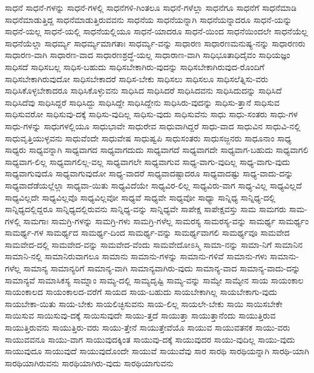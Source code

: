 {ಸಾಧನೆ
ಸಾಧನೆ-ಗಳನ್ನು
ಸಾಧನೆ-ಗಳಲ್ಲಿ
ಸಾಧನೆಗಳಿ-ಗಿಂತಲೂ
ಸಾಧನೆ-ಗಳೆಲ್ಲಾ
ಸಾಧನೆಗೂ
ಸಾಧನೆಗೆ
ಸಾಧನೆಮಾಡಿ
ಸಾಧನೆಮಾಡುತ್ತಿದ್ದ
ಸಾಧನೆಮಾಡುತ್ತಿರುವವನು
ಸಾಧನೆಯ
ಸಾಧನೆಯನ್ನಾಗಿ
ಸಾಧನೆಯನ್ನಾದರೂ
ಸಾಧನೆ-ಯನ್ನು
ಸಾಧನೆ-ಯಲ್ಲ
ಸಾಧನೆ-ಯಲ್ಲಿ
ಸಾಧನೆಯಲ್ಲಿಯೂ
ಸಾಧನೆ-ಯಾದರೂ
ಸಾಧನೆ-ಯಿಂದ
ಸಾಧನೆಯಿಂದಲೇ
ಸಾಧನೆಯೆಲ್ಲ
ಸಾಧನೆಯೆಲ್ಲಾ
ಸಾಧರ್ಮ್ಯ
ಸಾಧರ್ಮ್ಯಮಾಗತಾಃ
ಸಾಧರ್ಮ್ಯ-ವನ್ನು
ಸಾಧಾರಣ
ಸಾಧಾರಣಮನುಷ್ಯ-ನನ್ನು
ಸಾಧಾರಣರು
ಸಾಧಾರಣ-ವಾಗಿ
ಸಾಧಾರಣ-ವಾದ
ಸಾಧಾರಣಶ್ರದ್ಧೆ-ಯಲ್ಲ
ಸಾಧಾರಾಣ-ವಾಗಿ
ಸಾಧಿಭೂತಾಧಿದೈವಂ
ಸಾಧಿಯಜ್ಞಂ
ಸಾಧಿಸದೆ
ಸಾಧಿಸಬಲ್ಲ
ಸಾಧಿಸ-ಬಹುದು
ಸಾಧಿಸಬೇಕಾಗಿರು-ವುದನ್ನು
ಸಾಧಿಸಬೇಕಾಗಿರುವುದ-ರೊಂದಿಗೆ
ಸಾಧಿಸಬೇಕಾಗಿರುವುದೋ
ಸಾಧಿಸಬೇಕಾದರೆ
ಸಾಧಿಸ-ಬೇಕು
ಸಾಧಿಸಲು
ಸಾಧಿಸಲೂ
ಸಾಧಿಸಲೆತ್ನಿಸು-ವರು
ಸಾಧಿಸಿಕೊಳ್ಳಬೇಕಾದರೂ
ಸಾಧಿಸಿಕೊಳ್ಳುವನು
ಸಾಧಿಸಿದ
ಸಾಧಿಸಿದರೆ
ಸಾಧಿಸಿದವನು
ಸಾಧಿಸಿದುದನ್ನು
ಸಾಧಿಸಿದೆ
ಸಾಧಿಸಿದೆವು
ಸಾಧಿಸಿದ್ದರೆ
ಸಾಧಿಸಿದ್ದು
ಸಾಧಿಸಿದ್ದೇ
ಸಾಧಿಸಿದ್ದೇನು
ಸಾಧಿಸಿರು-ವುದನ್ನು
ಸಾಧಿಸು-ತ್ತಾನೆ
ಸಾಧಿಸುವ
ಸಾಧಿಸುವರೋ
ಸಾಧಿಸುವು-ದಕ್ಕೆ
ಸಾಧಿಸು-ವುದಿಲ್ಲ
ಸಾಧಿಸು-ವುದು
ಸಾಧಿಸುವೆನು
ಸಾಧು
ಸಾಧು-ಸಂತರು
ಸಾಧು-ಗಳ
ಸಾಧು-ಗಳನ್ನು
ಸಾಧುಗಳಲ್ಲಿಯೂ
ಸಾಧುಭಾವೇ
ಸಾಧುರೇವ
ಸಾಧುವಾಗಿದ್ದರೆ
ಸಾಧು-ವಾದ
ಸಾಧುವಿನ
ಸಾಧುವಿ-ನಲ್ಲಿ
ಸಾಧುವೃತ್ತಿಯುಳ್ಳವನು
ಸಾಧುವೆಂದೇ
ಸಾಧುವೇಷ
ಸಾಧುಷ್ವಪಿ
ಸಾಧುಸಂತರು
ಸಾಧುಸಜ್ಜನರು
ಸಾಧೂನಾಂ
ಸಾಧ್ಯ
ಸಾಧ್ಯರು
ಸಾಧ್ಯವನ್ನಾಗಿ
ಸಾಧ್ಯವಾಗದ
ಸಾಧ್ಯವಾಗದುದು
ಸಾಧ್ಯವಾಗದೆ
ಸಾಧ್ಯವಾಗದೇ
ಸಾಧ್ಯವಾಗ-ಬಹುದು
ಸಾಧ್ಯವಾಗಲಿ
ಸಾಧ್ಯವಾಗ-ಲಿಲ್ಲ
ಸಾಧ್ಯವಾಗಲಿಲ್ಲ-ವಲ್ಲ
ಸಾಧ್ಯವಾಗಲೇ
ಸಾಧ್ಯವಾಗುವ
ಸಾಧ್ಯ-ವಾಗು-ವುದಿಲ್ಲ
ಸಾಧ್ಯ-ವಾಗು-ವುದು
ಸಾಧ್ಯವಾಗುವುದೊ
ಸಾಧ್ಯವಾಗುವುದೋ
ಸಾಧ್ಯ-ವಾದರೆ
ಸಾಧ್ಯವಾದಷ್ಟಾದರೂ
ಸಾಧ್ಯವಾದಷ್ಟು
ಸಾಧ್ಯ-ವಾದು-ದನ್ನು
ಸಾಧ್ಯವಾದೆಡೆಯಲ್ಲೆಲ್ಲಾ
ಸಾಧ್ಯವಾ-ಯಿತು
ಸಾಧ್ಯವಿದೆಯೇ
ಸಾಧ್ಯವಿರ-ಲಿಲ್ಲ
ಸಾಧ್ಯವಿರು-ವಾಗ
ಸಾಧ್ಯ-ವಿಲ್ಲ
ಸಾಧ್ಯವಿಲ್ಲದೆ
ಸಾಧ್ಯವಿಲ್ಲದೇ
ಸಾಧ್ಯವಿಲ್ಲವೊ
ಸಾಧ್ಯವಿಲ್ಲವೋ
ಸಾಧ್ಯವೆ
ಸಾಧ್ಯವೇ
ಸಾಧ್ಯವೋ
ಸಾಧ್ಯಾ
ಸಾನ್ನಿಧ್ಯ
ಸಾನ್ನಿಧ್ಯ-ದಲ್ಲಿ
ಸಾನ್ನಿಧ್ಯದಲ್ಲಿದ್ದರೂ
ಸಾನ್ನಿಧ್ಯದಲ್ಲಿರುವನು
ಸಾನ್ನಿಧ್ಯ-ವನ್ನು
ಸಾನ್ನಿಧ್ಯವೇ
ಸಾಪೇಕ್ಷ
ಸಾಪೇಕ್ಷವಸ್ತು
ಸಾಮ
ಸಾಮಗರು
ಸಾಮ-ಗಳಲ್ಲಿ
ಸಾಮಗಾಃ
ಸಾಮಗ್ರಿ-ಗಳನ್ನು
ಸಾಮಗ್ರಿ-ಗಳು
ಸಾಮಗ್ರಿ-ಗಳೆಲ್ಲ
ಸಾಮರಸ್ಯ
ಸಾಮರಸ್ಯ-ವನ್ನು
ಸಾಮರ್ಥ್ಯ
ಸಾಮರ್ಥ್ಯಂ
ಸಾಮರ್ಥ್ಯ-ಗಳ
ಸಾಮರ್ಥ್ಯದ
ಸಾಮರ್ಥ್ಯ-ದಿಂದ
ಸಾಮರ್ಥ್ಯ-ವನ್ನು
ಸಾಮರ್ಥ್ಯವಾಗಲಿ
ಸಾಮರ್ಥ್ಯವೂ
ಸಾಮವೇದ
ಸಾಮವೇದ-ದಲ್ಲಿ
ಸಾಮವೇದ-ವನ್ನು
ಸಾಮವೇದ-ವೆಂದು
ಸಾಮವೇದೋಽಸ್ಮಿ
ಸಾಮಾ-ನನ್ನು
ಸಾಮಾ-ನಿಗೆ
ಸಾಮಾನಿನ
ಸಾಮಾನಿ-ನಲ್ಲಿ
ಸಾಮಾನಿರುವಾಗಲೂ
ಸಾಮಾನು
ಸಾಮಾನು-ಗಳನ್ನು
ಸಾಮಾನು-ಗಳಿವೆ
ಸಾಮಾನು-ಗಳು
ಸಾಮಾನು-ಗಳೆಲ್ಲ
ಸಾಮಾನ್ಯ
ಸಾಮಾನ್ಯರಿಗೆ
ಸಾಮಾನ್ಯ-ವಾಗಿ
ಸಾಮಾನ್ಯವಾಗಿರು-ವುದು
ಸಾಮಾನ್ಯ-ವಾದ
ಸಾಮಾನ್ಯ-ವಾದು-ದನ್ನು
ಸಾಮಾನ್ಯವೆ
ಸಾಮಾಸಿಕಸ್ಯ
ಸಾಮ್ನಾಂ
ಸಾಮ್ಯ-ದಲ್ಲಿ
ಸಾಮ್ಯದೃಷ್ಟಿ
ಸಾಮ್ಯ-ವನ್ನು
ಸಾಮ್ಯೇ
ಸಾಮ್ಯೇನ
ಸಾಯ
ಸಾಯಂಕಾಲ
ಸಾಯಂಕಾಲದ
ಸಾಯಂಕಾಲದ-ವರೆಗೆ
ಸಾಯದ
ಸಾಯ-ಬಹುದು
ಸಾಯಬೇಕಾಗಿಲ್ಲ
ಸಾಯಬೇಕಾಗು-ವುದು
ಸಾಯಬೇಕಾ-ಯಿತು
ಸಾಯ-ಬೇಕು
ಸಾಯಲಿಚ್ಛಿಸುವನು
ಸಾಯ-ಲಿಲ್ಲ
ಸಾಯಲೇ-ಬೇಕು
ಸಾಯಿ
ಸಾಯಿಸಬೇಕೇ
ಸಾಯಿಸುವ
ಸಾಯಿಸುವು-ದಕ್ಕೆ
ಸಾಯಿಸುವುದೇ
ಸಾಯು-ತ್ತದೆ
ಸಾಯುತ್ತಾ
ಸಾಯುತ್ತಾನೆಂದು
ಸಾಯುತ್ತಿರುವ
ಸಾಯುತ್ತಿರುವನು
ಸಾಯುತ್ತಿರು-ವರು
ಸಾಯು-ತ್ತೇನೆ
ಸಾಯುತ್ತೇವೆಯೊ
ಸಾಯುವ
ಸಾಯುವತನಕ
ಸಾಯು-ವರು
ಸಾಯುವವನೂ
ಸಾಯು-ವಾಗ
ಸಾಯುವುದಕ್ಕಿಂತ
ಸಾಯುವು-ದಕ್ಕೆ
ಸಾಯುವುದರ
ಸಾಯು-ವುದಿಲ್ಲ
ಸಾಯು-ವುದು
ಸಾಯುವುದೂ
ಸಾಯುವುದೆ
ಸಾಯುವುದೊಂದೇ
ಸಾಯುವೆ
ಸಾಯುವೆವು
ಸಾರ
ಸಾರಥಿ
ಸಾರಥಿಯನ್ನಾಗಿ
ಸಾರಥಿ-ಯಾಗಿ
ಸಾರಥಿಯಾಗಿರುವನು
ಸಾರಥಿಯಾಗಿರು-ವುದು
ಸಾರಥಿಯಾಗುವನು
}
